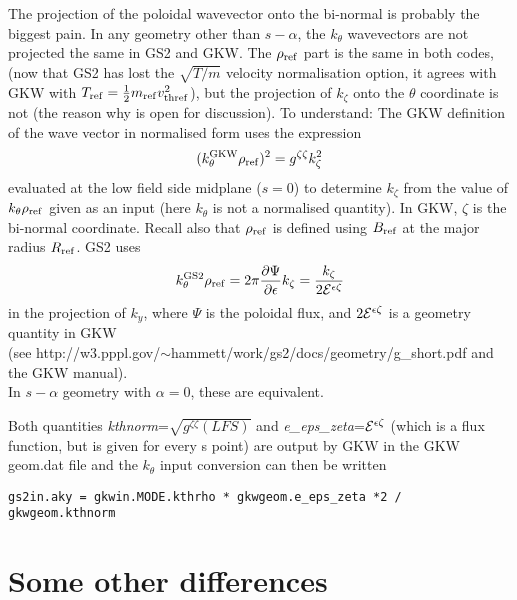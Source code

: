 \documentclass[a4paper,10pt]{article}
\newcommand{\name}[1]{\textsl{#1}} %
\begin{document}
The projection of the poloidal wavevector onto the bi-normal is probably the biggest pain.  In any geometry other than $s-\alpha$, the $k_\theta$ wavevectors are not projected the same in GS2 and GKW.   The $\rho_{\rm ref}$ part is the same in both codes, (now that GS2 has lost the $\sqrt{T / m}$  velocity normalisation option, it agrees with GKW with $T_{\rm ref} = {1 \over 2} m_{\rm ref} v_{\rm thref}^2$), but the projection of $k_\zeta$ onto the $\theta$ coordinate is not (the reason why is open for discussion).   
To understand: The GKW definition of the wave vector in normalised form uses the expression 
\begin{equation}
(k_\theta^{\rm GKW} \rho_{\rm ref} )^2 = g^{\zeta \zeta} k_\zeta^2  
\end{equation}
evaluated at the low field side midplane ($s=0$) to determine $k_\zeta$ from the value of $k_\theta \rho_{\rm ref}$ given as an input (here
$k_\theta$ is not a normalised quantity).  In GKW, $\zeta$ is the bi-normal coordinate.   Recall also that $\rho_{\rm ref}$ is defined using $B_{\rm ref}$ at the major radius $R_{\rm ref}$.  GS2 uses 
\begin{equation}
k_\theta^{\rm GS2} \rho_{\rm ref} = 2 \pi \frac{\partial \Psi}{\partial \epsilon} k_\zeta = \frac{k_\zeta}{2{\cal E}^{\epsilon \zeta}}  
\end{equation}
in the projection of $k_y$, where $\Psi$ is the poloidal flux, and $2{\cal E}^{\epsilon \zeta}$ is a geometry quantity in GKW\\
(see http://w3.pppl.gov/$\sim$hammett/work/gs2/docs/geometry/g\_short.pdf and the GKW manual).\\
In $s-\alpha$ geometry with $\alpha = 0$, these are equivalent.

Both quantities \name{kthnorm}=$\sqrt{g^{\zeta \zeta}(LFS)}$ and \name{e\_eps\_zeta}=${\cal E}^{\epsilon \zeta}$ (which is a flux function, but is given for every s point) are output by GKW in the GKW geom.dat file and the $k_\theta$ input conversion can then be written
\begin{verbatim}
gs2in.aky = gkwin.MODE.kthrho * gkwgeom.e_eps_zeta *2 / gkwgeom.kthnorm
\end{verbatim}


\section{Some other differences}
\end{document}
